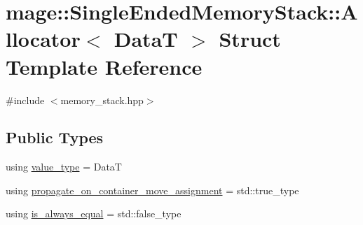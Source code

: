 \hypertarget{structmage_1_1_single_ended_memory_stack_1_1_allocator}{}\section{mage\+:\+:Single\+Ended\+Memory\+Stack\+:\+:Allocator$<$ DataT $>$ Struct Template Reference}
\label{structmage_1_1_single_ended_memory_stack_1_1_allocator}


{\ttfamily \#include $<$memory\+\_\+stack.\+hpp$>$}

\subsection*{Public Types}
\begin{DoxyCompactItemize}
\item 
using \hyperlink{structmage_1_1_single_ended_memory_stack_1_1_allocator_a4d5b98a534ad4e6d6f2d8eb1280398ab}{value\+\_\+type} = DataT
\item 
using \hyperlink{structmage_1_1_single_ended_memory_stack_1_1_allocator_a408c0a4b29dc60e9564245c6a0a6fd4c}{propagate\+\_\+on\+\_\+container\+\_\+move\+\_\+assignment} = std\+::true\+\_\+type
\item 
using \hyperlink{structmage_1_1_single_ended_memory_stack_1_1_allocator_a64d005be12e9d1749c0e6eeea5107a98}{is\+\_\+always\+\_\+equal} = std\+::false\+\_\+type
\end{DoxyCompactItemize}
